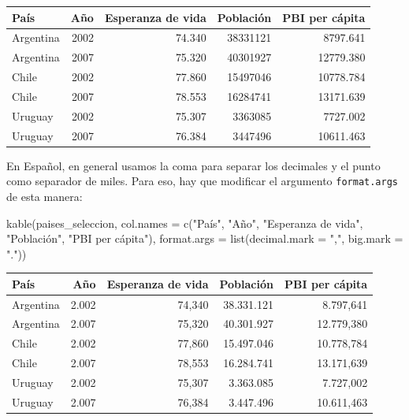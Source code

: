 \documentclass[
  openany]{book}
\newenvironment{Shaded}{\begin{snugshade}}{\end{snugshade}}
\newcommand{\AttributeTok}[1]{\textcolor[rgb]{0.77,0.63,0.00}{#1}}
\newcommand{\FunctionTok}[1]{\textcolor[rgb]{0.00,0.00,0.00}{#1}}
\newcommand{\NormalTok}[1]{#1}
\newcommand{\StringTok}[1]{\textcolor[rgb]{0.31,0.60,0.02}{#1}}
\begin{document}
\begin{tabular}{l|r|r|r|r}
\hline
País & Año & Esperanza de vida & Población & PBI per cápita\\
\hline
Argentina & 2002 & 74.340 & 38331121 & 8797.641\\
\hline
Argentina & 2007 & 75.320 & 40301927 & 12779.380\\
\hline
Chile & 2002 & 77.860 & 15497046 & 10778.784\\
\hline
Chile & 2007 & 78.553 & 16284741 & 13171.639\\
\hline
Uruguay & 2002 & 75.307 & 3363085 & 7727.002\\
\hline
Uruguay & 2007 & 76.384 & 3447496 & 10611.463\\
\hline
\end{tabular}

En Español, en general usamos la coma para separar los decimales y el punto como separador de miles.
Para eso, hay que modificar el argumento \texttt{format.args} de esta manera:

\begin{Shaded}
\begin{Highlighting}[]
\FunctionTok{kable}\NormalTok{(paises\_seleccion, }
      \AttributeTok{col.names =} \FunctionTok{c}\NormalTok{(}\StringTok{"País"}\NormalTok{, }\StringTok{"Año"}\NormalTok{, }\StringTok{"Esperanza de vida"}\NormalTok{, }\StringTok{"Población"}\NormalTok{, }\StringTok{"PBI per cápita"}\NormalTok{),}
      \AttributeTok{format.args =} \FunctionTok{list}\NormalTok{(}\AttributeTok{decimal.mark =} \StringTok{","}\NormalTok{, }\AttributeTok{big.mark =} \StringTok{"."}\NormalTok{))}
\end{Highlighting}
\end{Shaded}

\begin{tabular}{l|r|r|r|r}
\hline
País & Año & Esperanza de vida & Población & PBI per cápita\\
\hline
Argentina & 2.002 & 74,340 & 38.331.121 & 8.797,641\\
\hline
Argentina & 2.007 & 75,320 & 40.301.927 & 12.779,380\\
\hline
Chile & 2.002 & 77,860 & 15.497.046 & 10.778,784\\
\hline
Chile & 2.007 & 78,553 & 16.284.741 & 13.171,639\\
\hline
Uruguay & 2.002 & 75,307 & 3.363.085 & 7.727,002\\
\hline
Uruguay & 2.007 & 76,384 & 3.447.496 & 10.611,463\\
\hline
\end{tabular}
\end{document}
